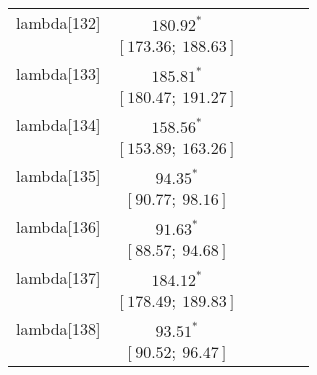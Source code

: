 \begin{table}
\begin{center}
\begin{tabular}{l c c c c c }
lambda[132] & $180.92^{*}$                     &                           &                           &                         &                         \\
            & $[173.36;\ 188.63]$              &                           &                           &                         &                         \\
lambda[133] & $185.81^{*}$                     &                           &                           &                         &                         \\
            & $[180.47;\ 191.27]$              &                           &                           &                         &                         \\
lambda[134] & $158.56^{*}$                     &                           &                           &                         &                         \\
            & $[153.89;\ 163.26]$              &                           &                           &                         &                         \\
lambda[135] & $94.35^{*}$                      &                           &                           &                         &                         \\
            & $[90.77;\ 98.16]$                &                           &                           &                         &                         \\
lambda[136] & $91.63^{*}$                      &                           &                           &                         &                         \\
            & $[88.57;\ 94.68]$                &                           &                           &                         &                         \\
lambda[137] & $184.12^{*}$                     &                           &                           &                         &                         \\
            & $[178.49;\ 189.83]$              &                           &                           &                         &                         \\
lambda[138] & $93.51^{*}$                      &                           &                           &                         &                         \\
            & $[90.52;\ 96.47]$                &                           &                           &                         &                         \\

\end{tabular}
\end{center}
\end{table}
